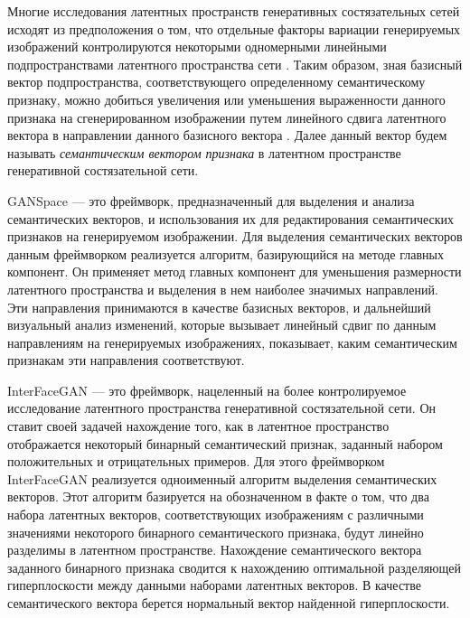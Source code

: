 Многие исследования латентных пространств генеративных состязательных сетей исходят из предположения о том, что отдельные факторы вариации генерируемых изображений контролируются некоторыми одномерными линейными подпространствами латентного пространства сети \cite{StyleGAN}.
Таким образом, зная базисный вектор подпространства, соответствующего определенному семантическому признаку, можно добиться увеличения или уменьшения выраженности данного признака на сгенерированном изображении путем линейного сдвига латентного вектора в направлении данного базисного вектора \cite{abdal2019image2stylegan}. 
Далее данный вектор будем называть \emph{семантическим вектором признака} в латентном пространстве генеративной состязательной сети.

GANSpace \cite{hrknen2020ganspace} --- это фреймворк, предназначенный для выделения и анализа семантических векторов, и использования их для редактирования семантических признаков на генерируемом изображении.
Для выделения семантических векторов данным фреймворком реализуется алгоритм, базирующийся на методе главных компонент.
Он применяет метод главных компонент для уменьшения размерности латентного пространства и выделения в нем наиболее значимых направлений. Эти направления принимаются в качестве базисных векторов, и дальнейший визуальный анализ изменений, которые вызывает линейный сдвиг по данным направлениям на генерируемых изображениях, показывает, каким семантическим признакам эти направления соответствуют.

InterFaceGAN \cite{shen2020interfacegan} --- это фреймворк, нацеленный на более контролируемое исследование латентного пространства генеративной состязательной сети.
Он ставит своей задачей нахождение того, как в латентное пространство отображается некоторый бинарный семантический признак, заданный набором положительных и отрицательных примеров.
Для этого фреймворком InterFaceGAN реализуется одноименный алгоритм выделения семантических векторов.
Этот алгоритм базируется на обозначенном в \cite{StyleGAN} факте о том, что два набора латентных векторов, соответствующих изображениям с различными значениями некоторого бинарного семантического признака, будут линейно разделимы в латентном пространстве.
Нахождение семантического вектора заданного бинарного признака сводится к нахождению оптимальной разделяющей гиперплоскости между данными наборами латентных векторов.
В качестве семантического вектора берется нормальный вектор найденной гиперплоскости.
